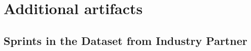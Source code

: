 %
%
%

\appendix

\chapter{Additional artifacts}
\label{introA} %

\section{Sprints in the Dataset from Industry Partner}
\label{sec:dataset-sdm}


